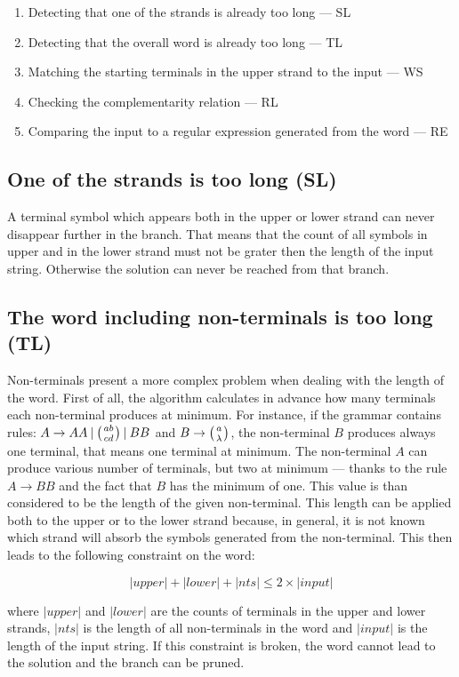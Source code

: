 \begin{enumerate}
  \item{Detecting that one of the strands is already too long --- SL}
  \item{Detecting that the overall word is already too long --- TL}
  \item{Matching the starting terminals in the upper strand to the input --- WS}
  \item{Checking the complementarity relation --- RL}
  \item{Comparing the input to a regular expression generated from the word --- RE}
\end{enumerate}


\subsection{One of the strands is too long (SL)}
A terminal symbol which appears both in the upper or lower strand can never disappear further in the branch. That means that the count of all symbols in upper and in the lower strand must not be grater then the length of the input string. Otherwise the solution can never be reached from that branch.

\subsection{The word including non-terminals is too long (TL)}
Non-terminals present a more complex problem when dealing with the length of the word. First of all, the algorithm calculates in advance how many terminals each non-terminal produces at minimum. For instance, if the grammar contains rules: $A \rightarrow A A \:|\: \wkpair{ab}{cd} \:|\: B B$ and $B \rightarrow \wkpair{a}{\lambda}$, the non-terminal $B$ produces always one terminal, that means one terminal at minimum. The non-terminal $A$ can produce various number of terminals, but two at minimum --- thanks to the rule $A \rightarrow B B$ and the fact that $B$ has the minimum of one. This value is than considered to be the length of the given non-terminal.
This length can be applied both to the upper or to the lower strand because, in general, it is not known which strand will absorb the symbols generated from the non-terminal.
This then leads to the following constraint on the word:

$$|upper| + |lower| + |nts| \leq 2 \times |input|$$

where $|upper|$ and $|lower|$ are the counts of terminals in the upper and lower strands, $|nts|$ is the length of all non-terminals in the word and $|input|$ is the length of the input string. If this constraint is broken, the word cannot lead to the solution and the branch can be pruned.


